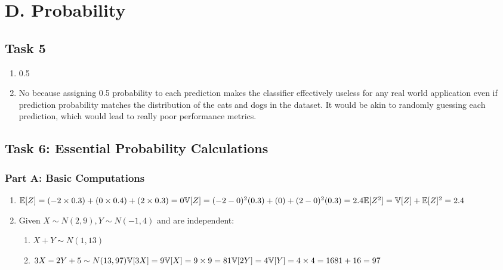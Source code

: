 \documentclass[12pt]{article}
\begin{document}
\section{D. Probability}
\subsection{Task 5}
\begin{enumerate}[i]
	\item 0.5
	\item No because assigning 0.5 probability to each prediction makes the classifier effectively useless for any real world application even if prediction probability matches the distribution of the cats and dogs in the dataset. It would be akin to randomly guessing each prediction, which would lead to really poor performance metrics.
\end{enumerate}
\subsection{Task 6: Essential Probability Calculations}
\subsubsection{Part A: Basic Computations}
\begin{enumerate}
	\item $\mathbb{E}[Z] = (-2 \times 0.3) + (0 \times 0.4) + (2 \times 0.3) = 0 \\
	\mathbb{V}[Z] = (-2-0)^2(0.3) + (0) + (2-0)^2(0.3) = 2.4 \\
	\mathbb{E}[Z^2] = \mathbb{V}[Z] + \mathbb{E}[Z]^2 = 2.4$
	
	\item Given $X \sim N(2,9), Y \sim N(-1,4)$ and are independent:
	\begin{enumerate}
		\item $X+Y \sim N(1,13)$
		\item $3X-2Y+5 \sim N(13,97) \\
	\mathbb{V}[3X]=9\mathbb{V}[X] = 9 \times 9 = 81 \\
	\mathbb{V}[2Y] = 4\mathbb{V}[Y] = 4 \times 4 = 16 \\
	81 + 16 = 97$
	\end{enumerate}		
\end{enumerate}
\end{document}
